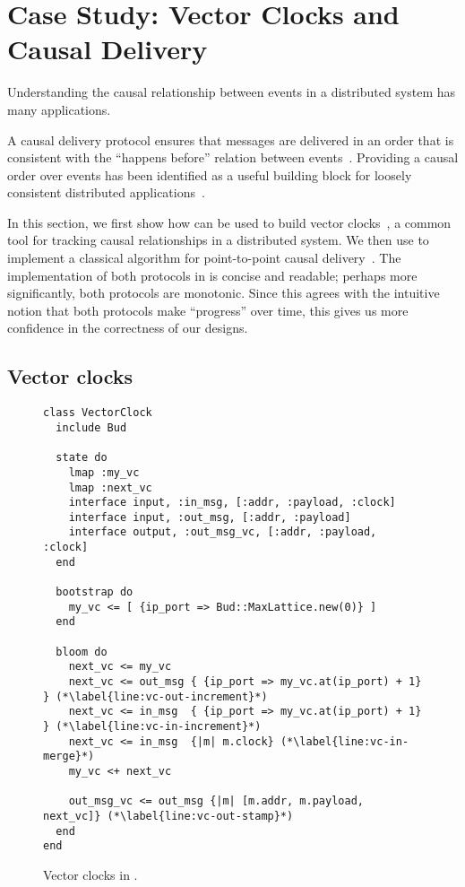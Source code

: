 \section{Case Study: Vector Clocks and Causal Delivery}
\label{sec:causal}
Understanding the causal relationship between events in a distributed system has
many applications.

A causal delivery protocol ensures that messages are delivered in an order that
is consistent with the ``happens before'' relation between
events~\cite{Lamport1978}. Providing a causal order over events has been
identified as a useful building block for loosely consistent distributed
applications~\cite{Lloyd2011}.

In this section, we first show how \lang can be used to build vector
clocks~\cite{Fidge1988,Mattern1989}, a common tool for tracking causal
relationships in a distributed system. We then use \lang to implement a
classical algorithm for point-to-point causal delivery~\cite{Schiper1989}. The
implementation of both protocols in \lang is concise and readable; perhaps more
significantly, both protocols are monotonic. Since this agrees with the
intuitive notion that both protocols make ``progress'' over time, this gives us
more confidence in the correctness of our designs.

\subsection{Vector clocks}
\begin{figure}[t]
\begin{scriptsize}
\begin{lstlisting}
class VectorClock
  include Bud

  state do
    lmap :my_vc
    lmap :next_vc
    interface input, :in_msg, [:addr, :payload, :clock]
    interface input, :out_msg, [:addr, :payload]
    interface output, :out_msg_vc, [:addr, :payload, :clock]
  end

  bootstrap do
    my_vc <= [ {ip_port => Bud::MaxLattice.new(0)} ]
  end

  bloom do
    next_vc <= my_vc
    next_vc <= out_msg { {ip_port => my_vc.at(ip_port) + 1} } (*\label{line:vc-out-increment}*)
    next_vc <= in_msg  { {ip_port => my_vc.at(ip_port) + 1} } (*\label{line:vc-in-increment}*)
    next_vc <= in_msg  {|m| m.clock} (*\label{line:vc-in-merge}*)
    my_vc <+ next_vc

    out_msg_vc <= out_msg {|m| [m.addr, m.payload, next_vc]} (*\label{line:vc-out-stamp}*)
  end
end
\end{lstlisting}
\end{scriptsize}
\caption{Vector clocks in \lang.}
\label{fig:vector-clock-src}
\end{figure}

